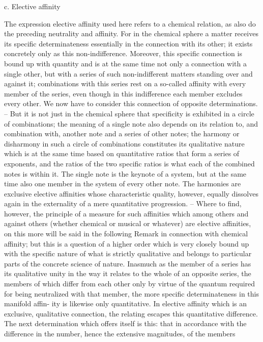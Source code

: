 c. Elective affinity

The expression elective affinity used here refers to a chemical relation, as
also do the preceding neutrality and affinity. For in the chemical sphere
a matter receives its specific determinateness essentially in the connection
with its other; it exists concretely only as this non-indifference. Moreover,
this specific connection is bound up with quantity and is at the same
time not only a connection with a single other, but with a series of such
non-indifferent matters standing over and against it; combinations with
this series rest on a so-called affinity with every member of the series, even
though in this indifference each member excludes every other. We now
have to consider this connection of opposite determinations. – But it is
not just in the chemical sphere that specificity is exhibited in a circle of
combinations; the meaning of a single note also depends on its relation
to, and combination with, another note and a series of other notes; the
harmony or disharmony in such a circle of combinations constitutes its
qualitative nature which is at the same time based on quantitative ratios
that form a series of exponents, and the ratios of the two specific ratios
is what each of the combined notes is within it. The single note is the
keynote of a system, but at the same time also one member in the system
of every other note. The harmonies are exclusive elective affinities whose
characteristic quality, however, equally dissolves again in the externality of
a mere quantitative progression. – Where to find, however, the principle
of a measure for such affinities which among others and against others
(whether chemical or musical or whatever) are elective affinities, on this
more will be said in the following Remark in connection with chemical
affinity; but this is a question of a higher order which is very closely bound
up with the specific nature of what is strictly qualitative and belongs to
particular parts of the concrete science of nature.
Inasmuch as the member of a series has its qualitative unity in the way it
relates to the whole of an opposite series, the members of which differ from
each other only by virtue of the quantum required for being neutralized
with that member, the more specific determinateness in this manifold affin-
ity is likewise only quantitative. In elective affinity which is an exclusive,
qualitative connection, the relating escapes this quantitative difference. The
next determination which offers itself is this: that in accordance with the
difference in the number, hence the extensive magnitudes, of the members
